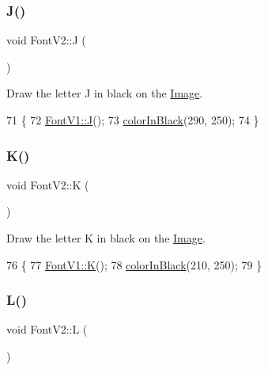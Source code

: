 \subsubsection{\texorpdfstring{J()}{J()}}
{\footnotesize\ttfamily void Font\+V2\+::J (\begin{DoxyParamCaption}{ }\end{DoxyParamCaption})}



Draw the letter J in black on the \mbox{\hyperlink{class_image}{Image}}. 


\begin{DoxyCode}
71                \{
72     \mbox{\hyperlink{class_font_v1_a3fe315f13fd21c6dbd5f81113cd1c3f6}{FontV1::J}}();
73     \mbox{\hyperlink{class_font_v2_a04f2501961bc286ce70fbb6a840b0e8a}{colorInBlack}}(290, 250);
74 \}
\end{DoxyCode}
\mbox{\label{class_font_v2_a1871c49a753378d2f50ad91ea8b26c10}} 
\subsubsection{\texorpdfstring{K()}{K()}}
{\footnotesize\ttfamily void Font\+V2\+::K (\begin{DoxyParamCaption}{ }\end{DoxyParamCaption})}



Draw the letter K in black on the \mbox{\hyperlink{class_image}{Image}}. 


\begin{DoxyCode}
76                \{
77     \mbox{\hyperlink{class_font_v1_a45ed7d1ac12bd32f458b5b144dd132ba}{FontV1::K}}();
78     \mbox{\hyperlink{class_font_v2_a04f2501961bc286ce70fbb6a840b0e8a}{colorInBlack}}(210, 250);
79 \}
\end{DoxyCode}
\mbox{\label{class_font_v2_ae40068da683965bc711e752af9acf360}} 
\subsubsection{\texorpdfstring{L()}{L()}}
{\footnotesize\ttfamily void Font\+V2\+::L (\begin{DoxyParamCaption}{ }\end{DoxyParamCaption})}



